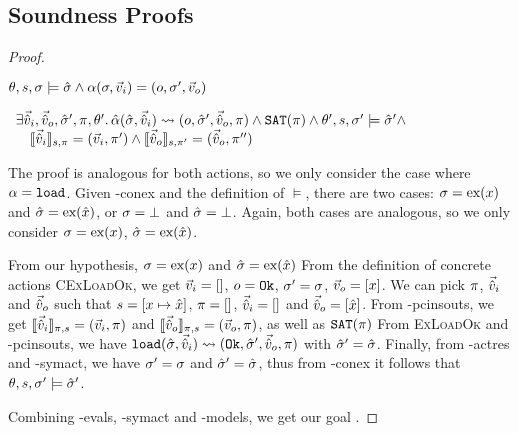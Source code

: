 \subsection{Soundness Proofs}

\begin{proof}


\pfassume \begin{hypvlist}
 $\theta,s,\st\models\sst \land \ppexecc{\alpha}{\st,\ins}{o,\st',\outs}$
\end{hypvlist}
\pfprove \begin{goalvlist}
 $
\begin{array}{l}
\exists \sins,\souts,\sst',\pc,\theta'\ldotp \ppexec{\hat\alpha}{\sst,\sins}{o,\sst',\souts,\pc} \land \SAT(\pc) \land \theta',s,\st'\models \sst' \land\\
\quad \expeval[s,\pc]{\sins}=(\ins,\pc')\land\expeval[s,\pc']{\souts}=(\souts,\pc'')
\end{array}
$
\end{goalvlist}

The proof is analogous for both actions, so we only consider the case where $\alpha=\load$. Given \hyp{conex} and the definition of $\models$, there are two cases: $\st=\ex{x}$ and $\sst=\ex{\sym x}$, or $\st=\bot$ and $\sst=\bot$. Again, both cases are analogous, so we only consider $\st=\ex{x}$, $\sst=\ex{\sym x}$.

\begin{hypvlist}
 From our hypothesis, $\st=\ex{x}$ and $\sst=\ex{\sym x}$
 From the definition of concrete actions \textsc{CExLoadOk}, we get $\ins=[]$, $o=\Ok$, $\st'=\st$, $\outs=[x]$.
 We can pick $\pc$, $\sins$ and $\souts$ such that $s=[x\mapsto \sym x]$, $\pc = []$, $\sins=[]$ and $\souts=[\sym x]$.
 From \hyp{pcinsouts}, we get $\expeval[\pc,s]{\sins}=(\ins,\pc)$ and $\expeval[\pc,s]{\souts}=(\outs,\pc)$, as well as $\SAT(\pc)$
 From \textsc{ExLoadOk} and \hyp{pcinsouts}, we have $\ppexec{\load}{\sst,\sins}{\Ok, \sst', \souts, \pc}$ with $\sst'=\sst$.
 Finally, from \hyp{actres} and \hyp{symact}, we have $\st'=\st$ and $\sst'=\sst$, thus from \hyp{conex} it follows that $\theta,s,\st'\models\sst'$.
\end{hypvlist}
Combining \hyp{evals}, \hyp{symact} and \hyp{models}, we get our goal .



\end{proof}
